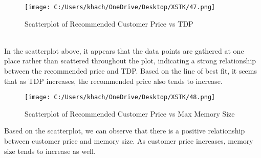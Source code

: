 \documentclass[a4paper]{article}
\begin{document}
	\begin{figure}[htbp]
		\centering
		\begin{adjustbox}{width=0.5\textwidth, frame}
			\texttt{[image: C:/Users/khach/OneDrive/Desktop/XSTK/47.png]}
		\end{adjustbox}
		\captionsetup{justification=centering}
		\vspace{0.5cm}
		\caption{Scatterplot of Recommended Customer Price vs TDP}
	\end{figure}
	\\
	In the scatterplot above, it appears that the data points are gathered at one place rather than scattered throughout the plot, indicating a strong relationship between the recommended price and TDP. Based on the line of best fit, it seems that as TDP increases, the recommended price also tends to increase.
	\newpage
	\begin{figure}[htbp]
		\centering
		\begin{adjustbox}{width=0.5\textwidth, frame}
			\texttt{[image: C:/Users/khach/OneDrive/Desktop/XSTK/48.png]}
		\end{adjustbox}
		\captionsetup{justification=centering}
		\vspace{0.5cm}
		\caption{Scatterplot of Recommended Customer Price vs Max Memory Size}
	\end{figure}
	Based on the scatterplot, we can observe that there is a positive relationship between customer price and memory size. As customer price increases, memory size tends to increase as well.
\end{document}
